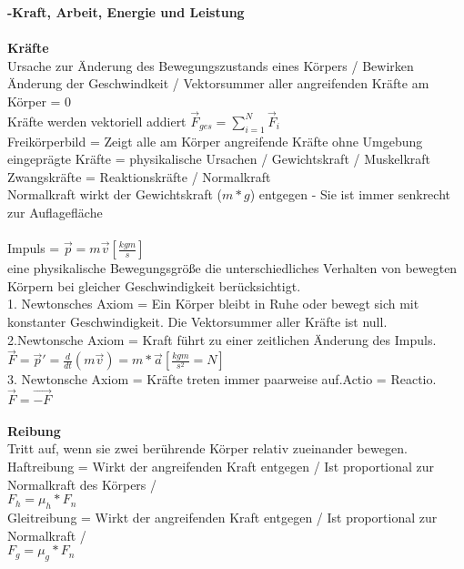 \documentclass[8pt]{article}
\begin{document}
\noindent
\textbf{{\large -Kraft, Arbeit, Energie und Leistung}}\\ \\
\noindent
\textbf{Kräfte}\\
Ursache zur Änderung des Bewegungszustands eines Körpers / Bewirken Änderung der Geschwindkeit / Vektorsummer aller angreifenden Kräfte am Körper = 0 \\
Kräfte werden vektoriell addiert $\overrightarrow{F}_{ges} = \sum_{i=1}^N \overrightarrow{F}_i$\\
Freikörperbild = Zeigt alle am Körper angreifende Kräfte ohne Umgebung\\
eingeprägte Kräfte = physikalische Ursachen / Gewichtskraft / Muskelkraft \\
Zwangskräfte = Reaktionskräfte / Normalkraft \\
Normalkraft wirkt der Gewichtskraft ($m*g$) entgegen - Sie ist immer senkrecht zur Auflagefläche\\ \\
\noindent 
Impuls = $\overrightarrow{p} = m\overrightarrow{v} [\frac{kgm}{s}]$ \\
eine physikalische Bewegungsgröße die unterschiedliches Verhalten von bewegten Körpern bei gleicher Geschwindigkeit berücksichtigt. \\
1. Newtonsches Axiom = Ein Körper bleibt in Ruhe oder bewegt sich mit konstanter Geschwindigkeit. Die Vektorsummer aller Kräfte ist null.\\
2.Newtonsche Axiom = Kraft führt zu einer zeitlichen Änderung des Impuls. \\
$\overrightarrow{F}=\overrightarrow{p}' = \frac{d}{dt}(m\overrightarrow{v})= m*\overrightarrow{a} [\frac{kgm}{s^2}=N]$\\
3. Newtonsche Axiom = Kräfte treten immer paarweise auf.Actio = Reactio.\\
$\overrightarrow{F}=\overrightarrow{-F}$ \\ \\
\noindent
\textbf{Reibung}\\
Tritt auf, wenn sie zwei berührende Körper relativ zueinander bewegen.\\
Haftreibung = Wirkt der angreifenden Kraft entgegen / Ist proportional zur Normalkraft des Körpers / \\
$F_h = \mu_h * F_n$ \\
Gleitreibung = Wirkt der angreifenden Kraft entgegen / Ist proportional zur Normalkraft / \\
$F_g=\mu_g*F_n$\\
\end{document}

